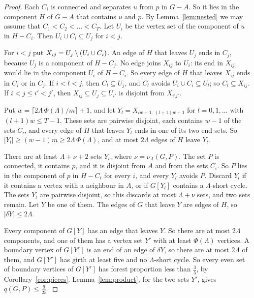 \begin{proof}
Each $C_i$ is connected and separates $u$ from $p$ in $G-A$. So it lies in the component $H$ of
$G-A$ that contains $u$ and $p$. By Lemma~\ref{lem:nested} we may assume that
$C_1<C_2<\dots<C_T$. Let $U_i$ be the vertex set of the component of $u$ in $H-C_i$. Then
$U_i\cup C_i\subseteq U_j$ for $i<j$.

 For $i<j$ put $X_{ij}=U_j\setminus(U_i\cup C_i)$. An edge of $H$ that leaves $U_j$ ends
in $C_j$, because $U_j$ is a component of $H-C_j$. No edge joins $X_{ij}$ to $U_i$: its end in
$X_{ij}$ would lie in the component $U_i$ of $H-C_i$. So every edge of $H$ that leaves $X_{ij}$
ends in $C_i$ or in $C_j$. If $i<l<j$, then $C_l\subseteq U_j$, and $C_l$ avoids
$U_i\cup C_i\subseteq U_l$; so $C_l\subseteq X_{ij}$. If $i<j\le i'<j'$, then
$X_{ij}\subseteq U_j\subseteq U_{i'}$ is disjoint from $X_{i'j'}$.

Put $w=\lceil2\Lambda\,\Phi(\Lambda)/m\rceil+1$, and let $Y_l=X_{lw+1,\,(l+1)w+1}$ for
$l=0,1,\dots$ with $(l+1)w\le T-1$. These sets are pairwise disjoint, each contains $w-1$ of the
sets $C_i$, and every edge of $H$ that leaves $Y_l$ ends in one of its two end sets. So
$|Y_l|\ge(w-1)m\ge2\Lambda\,\Phi(\Lambda)$, and at most $2\Lambda$ edges of $H$ leave $Y_l$.

There are at least $\Lambda+\nu+2$ sets $Y_l$, where $\nu=\nu_\Lambda(G,P)$. The set $P$ is
connected, it contains $p$, and it is disjoint from $A$ and from the sets $C_i$. So $P$ lies in
the component of $p$ in $H-C_i$ for every $i$, and every $Y_l$ avoids $P$. Discard $Y_l$ if it
contains a vertex with a neighbour in $A$, or if $G[Y_l]$ contains a $\Lambda$-short cycle. The
sets $Y_l$ are pairwise disjoint, so this discards at most $\Lambda+\nu$ sets, and two sets
remain. Let $Y$ be one of them. The edges of $G$ that leave $Y$ are edges of $H$, so
$|\delta Y|\le2\Lambda$.

 Every component of $G[Y]$ has an edge that leaves $Y$. So there are at most
$2\Lambda$ components, and one of them has a vertex set $Y'$ with at least $\Phi(\Lambda)$
vertices. A boundary vertex of $G[Y']$ is an end of an edge of $\delta Y$, so there are at most
$2\Lambda$ of them, and $G[Y']$ has girth at least five and no $\Lambda$-short cycle. So every
even set of boundary vertices of $G[Y']$ has forest proportion less than $\frac35$, by
Corollary~\ref{cor:pieces}.
Lemma~\ref{lem:product}, for the two sets $Y'$, gives $q(G,P)\le\frac9{25}$.
\end{proof}

